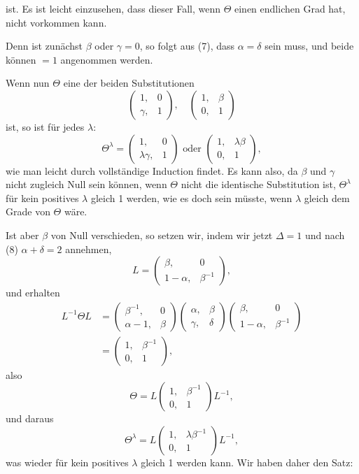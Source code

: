 ist. Es ist leicht einzusehen, dass dieser Fall, wenn $\Theta$ einen
endlichen Grad hat, nicht vorkommen kann.

Denn ist zunächst $\beta$ oder $\gamma = 0$, so folgt aus (7), dass
$\alpha = \delta$ sein muss, und beide können $= 1$ angenommen werden.

Wenn nun $\Theta$ eine der beiden Substitutionen
\[
\begin{pmatrix} 1, & 0 \\ \gamma, & 1 \end{pmatrix}, \quad
\begin{pmatrix} 1, & \beta \\ 0, & 1 \end{pmatrix}
\]
ist, so ist für jedes $\lambda$:
\[
\Theta^\lambda = \begin{pmatrix} 1, & 0 \\ \lambda\gamma, & 1 \end{pmatrix} \text{ oder } \begin{pmatrix} 1, & \lambda\beta \\ 0, & 1 \end{pmatrix},
\]
wie man leicht durch vollständige Induction findet. Es kann
also, da $\beta$ und $\gamma$ nicht zugleich Null sein können, wenn $\Theta$ nicht
die identische Substitution ist, $\Theta^\lambda$ für kein positives $\lambda$ gleich 1
werden, wie es doch sein müsste, wenn $\lambda$ gleich dem Grade von
$\Theta$ wäre.

Ist aber $\beta$ von Null verschieden, so setzen wir, indem wir
jetzt $\Delta = 1$ und nach (8) $\alpha + \delta = 2$ annehmen,
\[
L = \begin{pmatrix} \beta, & 0 \\ 1-\alpha, & \beta^{-1} \end{pmatrix},
\]
und erhalten
\[
\begin{aligned}
L^{-1}\Theta L &= \begin{pmatrix} \beta^{-1}, & 0 \\ \alpha-1, & \beta \end{pmatrix} \begin{pmatrix} \alpha, & \beta \\ \gamma, & \delta \end{pmatrix} \begin{pmatrix} \beta, & 0 \\ 1-\alpha, & \beta^{-1} \end{pmatrix} \\
&= \begin{pmatrix} 1, & \beta^{-1} \\ 0, & 1 \end{pmatrix},
\end{aligned}
\]
also
\[
\Theta = L \begin{pmatrix} 1, & \beta^{-1} \\ 0, & 1 \end{pmatrix} L^{-1},
\]
und daraus
\[
\Theta^\lambda = L \begin{pmatrix} 1, & \lambda\beta^{-1} \\ 0, & 1 \end{pmatrix} L^{-1},
\]
was wieder für kein positives $\lambda$ gleich 1 werden kann. Wir
haben daher den Satz:

